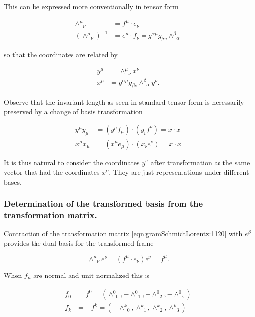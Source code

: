 This can be expressed more conventionally in tensor form

\begin{align}\label{eqn:gramSchmidtLorentz:1120}
{\wedge^\mu}_\nu &= f^\mu \cdot e_\nu \\
({\wedge^\mu}_\nu)^{-1} &= e^\mu \cdot f_\nu = g^{\alpha \mu} g_{\beta \nu} {\wedge^\beta}_\alpha
\end{align}

so that the coordinates are related by

\begin{align}\label{eqn:gramSchmidtLorentz:1140}
y^\mu &= {\wedge^\mu}_\nu x^\nu \\
x^\mu &= 
g^{\alpha \mu} g_{\beta \nu} {\wedge^\beta}_\alpha
y^\nu.
\end{align}

Observe that the invariant length as seen in standard tensor form is necessarily preserved by a change of basis transformation

\begin{align}\label{eqn:gramSchmidtLorentz:1160}
y^\mu y_\mu &= (y^\mu f_\mu) \cdot (y_\nu f^\nu) = x \cdot x \\
x^\mu x_\mu &= (x^\mu e_\mu) \cdot (x_\nu e^\nu) = x \cdot x 
\end{align}

It is thus natural to consider the coordinates $y^\alpha$ after transformation as the same vector that had the coordinates $x^\alpha$.  They are just representations under different bases.

\subsubsection{Determination of the transformed basis from the transformation matrix.}

Contraction of the transformation matrix \ref{eqn:gramSchmidtLorentz:1120} with $e^\beta$ provides the dual basis for the transformed frame

\begin{equation}\label{eqn:gramSchmidtLorentz:1200}
{\wedge^\mu}_\nu e^\nu = (f^\mu \cdot e_\nu) e^\nu = f^\mu.
\end{equation}

When $f_\mu$ are normal and unit normalized this is

\begin{align}\label{eqn:gramSchmidtLorentz:1220}
f_0 &= f^0 = ( {\wedge^0}_0, -{\wedge^0}_1, -{\wedge^0}_2, -{\wedge^0}_3 ) \\
f_k &= -f^k = ( -{\wedge^k}_0, {\wedge^k}_1, {\wedge^k}_2, {\wedge^k}_3 )
\end{align}

